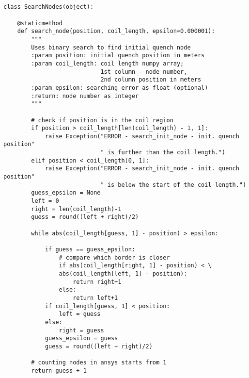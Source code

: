 
\begin{verbatim}
    

class SearchNodes(object):

    @staticmethod
    def search_node(position, coil_length, epsilon=0.000001):
        """
        Uses binary search to find initial quench node
        :param position: initial quench position in meters
        :param coil_length: coil length numpy array; 
                            1st column - node number, 
                            2nd column position in meters
        :param epsilon: searching error as float (optional)
        :return: node number as integer
        """
        
        # check if position is in the coil region
        if position > coil_length[len(coil_length) - 1, 1]:
            raise Exception("ERROR - search_init_node - init. quench position"
                            " is further than the coil length.")
        elif position < coil_length[0, 1]:
            raise Exception("ERROR - search_init_node - init. quench position"
                            " is below the start of the coil length.")
        guess_epsilon = None
        left = 0
        right = len(coil_length)-1
        guess = round((left + right)/2)
        
        while abs(coil_length[guess, 1] - position) > epsilon:
        
            if guess == guess_epsilon:
                # compare which border is closer
                if abs(coil_length[right, 1] - position) < \
                abs(coil_length[left, 1] - position):
                    return right+1
                else:
                    return left+1
            if coil_length[guess, 1] < position:
                left = guess
            else:
                right = guess
            guess_epsilon = guess
            guess = round((left + right)/2)

        # counting nodes in ansys starts from 1
        return guess + 1
\end{verbatim}